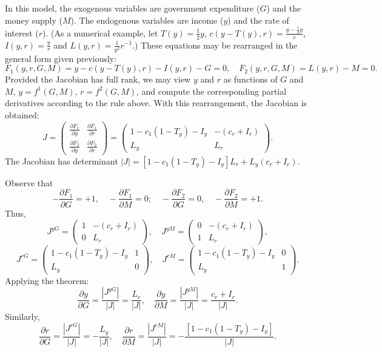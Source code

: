 \begin{original}
In this model, the exogenous variables are government expenditure ($G$) and the money supply ($M$). The endogenous variables are income ($y$) and the rate of interest ($r$). (As a numerical example, let $T(y) = \frac{1}{2}y$, $c(y - T(y), r) = \frac{y - \frac{1}{2}y}{r}$, $I(y, r) = \frac{y}{r}$ and $L(y, r) = \frac{1}{y^2}r^{-1}$.) These equations may be rearranged in the general form given previously:
\[
F_1(y, r, G, M) = y - c(y - T(y), r) - I(y, r) - G = 0, \quad F_2(y, r, G, M) = L(y, r) - M = 0.
\]
Provided the Jacobian has full rank, we may view $y$ and $r$ as functions of $G$ and $M$, $y = f^1(G, M)$, $r = f^2(G, M)$, and compute the corresponding partial derivatives according to the rule above. With this rearrangement, the Jacobian is obtained:
\[
J = \begin{pmatrix}
\frac{\partial F_1}{\partial y} & \frac{\partial F_1}{\partial r} \\[4pt]
\frac{\partial F_2}{\partial y} & \frac{\partial F_2}{\partial r}
\end{pmatrix}
= \begin{pmatrix}
1 - c_1(1 - T_y) - I_y & -(c_r + I_r) \\
L_y & L_r
\end{pmatrix}.
\]
The Jacobian has determinant $|J| = [1 - c_1(1 - T_y) - I_y]L_r + L_y(c_r + I_r)$.

Observe that
\[
-\frac{\partial F_1}{\partial G} = +1, \quad -\frac{\partial F_1}{\partial M} = 0; \quad
-\frac{\partial F_2}{\partial G} = 0, \quad -\frac{\partial F_2}{\partial M} = +1.
\]
Thus,
\[
J^{yG} = \begin{pmatrix} 1 & -(c_r + I_r) \\ 0 & L_r \end{pmatrix}, \quad
J^{yM} = \begin{pmatrix} 0 & -(c_r + I_r) \\ 1 & L_r \end{pmatrix},
\]
\[
J^{rG} = \begin{pmatrix} 1 - c_1(1 - T_y) - I_y & 1 \\ L_y & 0 \end{pmatrix}, \quad
J^{rM} = \begin{pmatrix} 1 - c_1(1 - T_y) - I_y & 0 \\ L_y & 1 \end{pmatrix}.
\]
Applying the theorem:
\[
\frac{\partial y}{\partial G} = \frac{|J^{yG}|}{|J|} = \frac{L_r}{|J|}, \quad
\frac{\partial y}{\partial M} = \frac{|J^{yM}|}{|J|} = \frac{c_r + I_r}{|J|}. \tag{7.11}
\]
Similarly,
\[
\frac{\partial r}{\partial G} = \frac{|J^{rG}|}{|J|} = -\frac{L_y}{|J|}, \quad
\frac{\partial r}{\partial M} = \frac{|J^{rM}|}{|J|} = -\frac{[1 - c_1(1 - T_y) - I_y]}{|J|}. \tag{7.12}
\]
\end{original}
